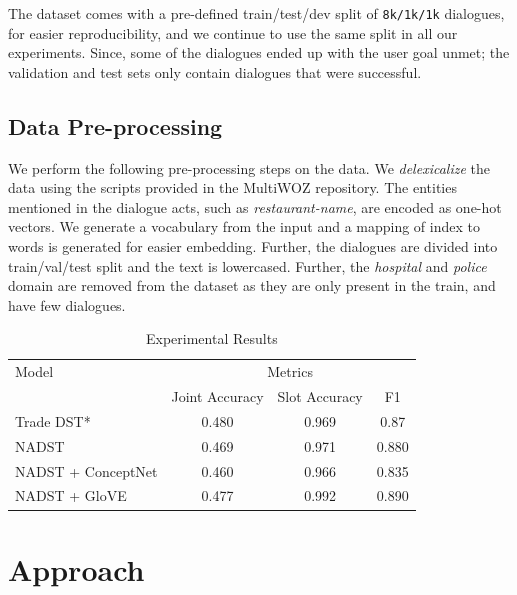\documentclass[12pt,a4paper]{article}
\begin{document}
\bigskip \noindent The dataset comes with a pre-defined train/test/dev split of \texttt{8k/1k/1k} dialogues, for easier reproducibility, and we continue to use the same split in all our experiments. Since, some of the dialogues ended up with the user goal unmet; the validation and test sets only contain dialogues that were successful.


\subsection{Data Pre-processing}

We perform the following pre-processing steps on the data. We \textit{delexicalize} the data using the scripts provided in the MultiWOZ repository. The entities mentioned in the dialogue acts, such as \textit{restaurant-name}, are encoded as one-hot vectors. We generate a vocabulary from the input and a mapping of index to words is generated for easier embedding. Further, the dialogues are divided into train/val/test split and the text is lowercased. Further, the \textit{hospital} and \textit{police} domain are removed from the dataset as they are only present in the train, and have few dialogues.

\begin{table}[!htbp]
  \caption{Experimental Results}
  \centering
  \begin{tabularx}{0.8 \textwidth}{Xccc}
    \toprule
    Model              & \multicolumn{3}{c}{Metrics}                         \\
    \cmidrule{2-4}
                       & Joint Accuracy              & Slot Accuracy & F1    \\
    \midrule
    Trade DST*         & 0.480                       & 0.969         & 0.87  \\
    NADST              & 0.469                       & 0.971         & 0.880 \\
    NADST + ConceptNet & 0.460                       & 0.966         & 0.835 \\
    NADST + GloVE      & 0.477                       & 0.992         & 0.890 \\
    \bottomrule
  \end{tabularx}
  \label{results}
\end{table}

\section{Approach}
\end{document}
